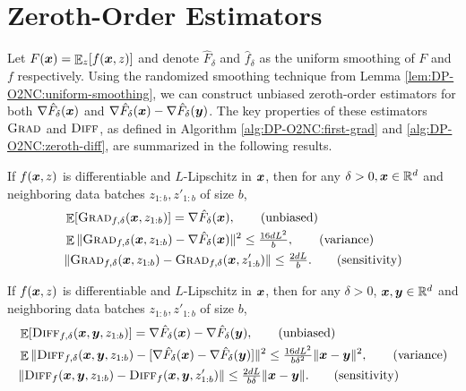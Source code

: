 \section{Zeroth-Order Estimators}
\label{sec:DP-O2NC_estimator}

Let $F({\boldsymbol{x}})=\mathop{\mathbb{E}}_z[f({\boldsymbol{x}},z)]$ and denote $\hat F_\delta$ and $\hat f_\delta$ as the uniform smoothing of $F$ and $f$ respectively.
Using the randomized smoothing technique from Lemma \ref{lem:DP-O2NC:uniform-smoothing}, we can construct unbiased zeroth-order estimators for both
$\nabla\hat F_\delta({\boldsymbol{x}})$ and $\nabla\hat F_\delta({\boldsymbol{x}}) - \nabla\hat F_\delta({\boldsymbol{y}})$.
The key properties of these estimators ${\normalfont\textsc{Grad}}$ and ${\normalfont\textsc{Diff}}$, as defined in Algorithm \ref{alg:DP-O2NC:first-grad} and \ref{alg:DP-O2NC:zeroth-diff}, are summarized in the following results.

\begin{lemma}
\label{lem:DP-O2NC:grad-estimator}
If $f({\boldsymbol{x}},z)$ is differentiable and $L$-Lipschitz in ${\boldsymbol{x}}$,
then for any $\delta>0, {\boldsymbol{x}}\in\mathbb R^d$ and neighboring data batches $z_{1:b},z'_{1:b}$ of size $b$,
\begin{align*}
    & \mathop{\mathbb{E}}[ {\normalfont\textsc{Grad}}_{f,\delta}({\boldsymbol{x}},z_{1:b}) ] = \nabla\hat F_\delta({\boldsymbol{x}}),  \tag{unbiased} \\
    & \mathop{\mathbb{E}}\| {\normalfont\textsc{Grad}}_{f,\delta}({\boldsymbol{x}},z_{1:b}) - \nabla\hat F_\delta({\boldsymbol{x}}) \|^2 \le \tfrac{16dL^2}{b},  \tag{variance} \\
    & \| {\normalfont\textsc{Grad}}_{f,\delta}({\boldsymbol{x}},z_{1:b}) - {\normalfont\textsc{Grad}}_{f,\delta}({\boldsymbol{x}},z'_{1:b}) \| \le \tfrac{2dL}{b}.  \tag{sensitivity}
\end{align*}
\end{lemma}

\begin{lemma}
\label{lem:DP-O2NC:diff-estimator}
If $f({\boldsymbol{x}},z)$ is differentiable and $L$-Lipschitz in ${\boldsymbol{x}}$,
then for any $\delta>0$, ${\boldsymbol{x}},{\boldsymbol{y}}\in\mathbb R^d$ and neighboring data batches $z_{1:b},z'_{1:b}$ of size $b$,
\begin{align*}
    &\mathop{\mathbb{E}}[{\normalfont\textsc{Diff}}_{f,\delta}({\boldsymbol{x}},{\boldsymbol{y}},z_{1:b})] = \nabla\hat F_\delta({\boldsymbol{x}}) - \nabla\hat F_\delta({\boldsymbol{y}}),  \tag{unbiased} \\
    &\mathop{\mathbb{E}}\|{\normalfont\textsc{Diff}}_{f,\delta}({\boldsymbol{x}},{\boldsymbol{y}},z_{1:b}) - [\nabla\hat F_\delta({\boldsymbol{x}}) -\nabla\hat F_\delta({\boldsymbol{y}})]\|^2 \le \tfrac{16dL^2}{b\delta^2}\|{\boldsymbol{x}}-{\boldsymbol{y}}\|^2,  \tag{variance} \\
    &\|{\normalfont\textsc{Diff}}_f({\boldsymbol{x}},{\boldsymbol{y}},z_{1:b}) - {\normalfont\textsc{Diff}}_f({\boldsymbol{x}},{\boldsymbol{y}},z'_{1:b})\| \le \tfrac{2dL}{b\delta}\|{\boldsymbol{x}}-{\boldsymbol{y}}\|. \tag{sensitivity}
\end{align*}
\end{lemma}

